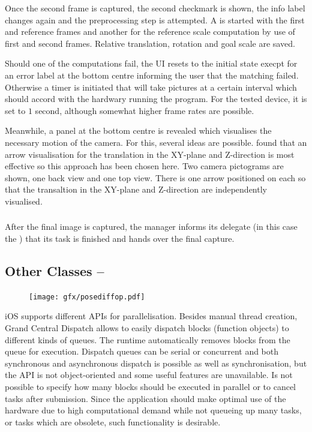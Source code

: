 Once the second frame is captured, the second checkmark is shown, the info
label changes again and the preprocessing step is attempted. A
 is started with the first and reference
frames and another for the reference scale computation by use of first and
second frames. Relative translation, rotation and goal scale are saved.

Should one of the computations fail, the UI resets to the initial state execpt
for an error label at the bottom centre informing the user that the matching
failed. Otherwise a timer is initiated that will take pictures at a certain
interval which should accord with the hardwary running the program. For the
tested device, it is set to $1$ second, although somewhat higher frame rates are
possible.

Meanwhile, a panel at the bottom centre is revealed which visualises the
necessary motion of the camera. For this, several ideas are possible.
\citet{bae2010} found that an arrow visualisation for the translation in the
XY-plane and Z-direction is most effective so this approach has been chosen
here. Two camera pictograms are shown, one back view and one top view. There is
one arrow positioned on each so that the transaltion in the XY-plane and
Z-direction are independently visualised.

\subsubsection*{}

After the final image is captured, the manager informs its delegate (in this
case the ) that its task is finished and hands over
the final capture.

\subsection{Other Classes -- }

\begin{figure}
   \texttt{[image: gfx/posediffop.pdf]}
\end{figure}
iOS supports different APIs for parallelisation. Besides manual thread creation,
Grand Central Dispatch allows to easily dispatch blocks (function objects) to
different kinds of queues. The runtime automatically removes blocks from the
queue for execution. Dispatch queues can be serial or concurrent and both
synchronous and asynchronous dispatch is possible as well as synchronisation,
but the API is not object-oriented and some useful features are unavailable.  Is
not possible to specify how many blocks should be executed in parallel or to
cancel tasks after submission. Since the application should make optimal use of
the hardware due to high computational demand while not queueing up many tasks,
or tasks which are obsolete, such functionality is desirable.

